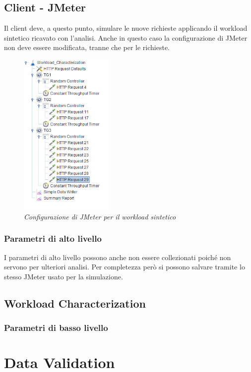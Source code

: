 \subsection{Client - JMeter}
Il client deve, a questo punto, simulare le nuove richieste applicando il workload sintetico ricavato con l'analisi. Anche in questo caso la configurazione di JMeter non deve essere modificata, tranne che per le richieste.
\begin{figure}[H]
	\centering
	\includegraphics[width=0.4\textwidth]{img/hw3/jmeter_sintetico.png}
	\caption{\textit{Configurazione di JMeter per il workload sintetico}}
\end{figure}

\subsubsection{Parametri di alto livello}
I parametri di alto livello possono anche non essere collezionati poiché non servono per ulteriori analisi. Per completezza però si possono salvare tramite lo stesso JMeter usato per la simulazione.


\subsection{Workload Characterization}
\subsubsection{Parametri di basso livello}

\section{Data Validation}